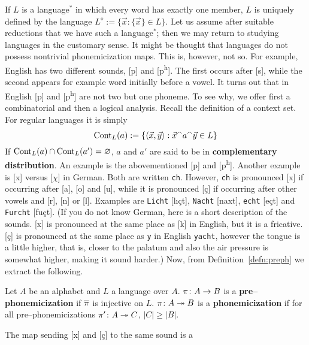 If $L$ is a language$^{\ast}$ in which every word has exactly
one member, $L$ is uniquely defined by the language
$L^{\diamond} := \{\vec{x} : \{\vec{x}\} \in L\}$. Let us assume
after suitable reductions that we have such a language$^{\ast}$;
then we may return to studying languages in the customary sense.
It might be thought that languages do not possess nontrivial
phonemicization maps. This is, however, not so. For example, English
has two different sounds, [p] and [p\textsuperscript{h}]. The first 
occurs after [s], while the second appears for example word initially 
before a vowel. It turns out that in English [p] and 
[p\textsuperscript{h}] are not two but one phoneme. To see why, 
we offer first a combinatorial and then a logical analysis. Recall 
the definition of a context set. For regular languages it is 
simply
\begin{equation}
\operatorname{Cont}_L(a) := \{\langle \vec{x}, \vec{y} \rangle :
        \vec{x}{^{\smallfrown}} a{^{\smallfrown}}\vec{y} \in L\}
\end{equation}
If $\operatorname{Cont}_L(a) \cap \operatorname{Cont}_L(a') = \varnothing$,  $a$ and $a'$ are said 
to be in \textbf{complementary distribution}. An example is the
abovementioned [p] and [p\textsuperscript{h}]. Another example is [x] 
versus [$\chi$] in German. Both are written {\tt ch}. However, {\tt ch}
is pronounced [x] if occurring after [a], [o] and [u], while it is
pronounced [\c{c}] if occurring after other vowels and [r], [n]
or [l]. Examples are {\tt Licht} [\textprimstress l\i\c{c}t], 
{\tt Nacht} [\textprimstress naxt], {\tt echt} [\textprimstress e\c{c}t] 
and {\tt Furcht} [\textprimstress fu\textinvscr\c{c}t]. (If you do not 
know German, here is a short description of the sounds. [x] is
pronounced at the same place as [k] in English, but it is a
fricative. [\c{c}] is pronounced at the same place as {\tt y} in
English {\tt yacht}, however the tongue is a little higher, that
is, closer to the palatum and also the air pressure is somewhat
higher, making it sound harder.) Now, from
Definition~\ref{defn:preph} we extract the following.
\begin{defn}
Let $A$ be an alphabet and $L$ a language over $A$. 
$\pi \colon A \rightarrow B$
is a \textbf{pre--phonemicization} if $\overline{\pi}$ is injective on
$L$. $\pi \colon A \twoheadrightarrow B$ is a \textbf{phonemicization} if for all
pre--phonemicizations $\pi' \colon A \twoheadrightarrow C$, $|C| \geq |B|$.
\end{defn}
The map sending [x] and [\c{c}] to the same sound is a
